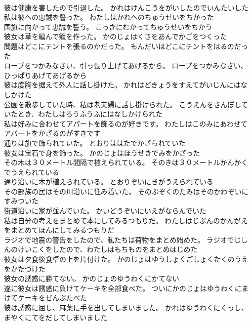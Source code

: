 \documentclass[8pt]{extreport}
\begin{document}
\begin{CJK}{UTF8}{min}
\\	彼は健康を害したので引退した。	かれはけんこうをがいしたのでいんたいした 
\\	私は彼への忠誠を誓った。	わたしはかれへのちゅうせいをちかった 
\\	国旗に向かって忠誠を誓う。	こっきにむかってちゅうせいをちかう 
\\	彼女は草を編んで籠を作った。	かのじょはくさをあんでかごをつくった 
\\	問題はどこにテントを張るのかだった。	もんだいはどこにテントをはるのだった 
\\	ロープをつかみなさい、引っ張り上げてあげるから。	ロープをつかみなさい、ひっぱりあげてあげるから 
\\	彼は度胸を据えて外人に話し掛けた。	かれはどきょうをすえてがいじんにはなしかけた 
\\	公園を散歩していた時、私は老夫婦に話し掛けられた。	こうえんをさんぽしていたとき、わたしはろうふうふにはなしかけられた 
\\	私は好みに合わせてアパートを飾るのが好きです。	わたしはこのみにあわせてアパートをかざるのがすきです 
\\	通りは旗で飾られていた。	とおりははたでかざられていた 
\\	彼女は宝石で身を飾った。	かのじょはほうせきでみをかざった 
\\	その木は３０メートル間隔で植えられている。	そのきは３０メートルかんかくでうえられている 
\\	通り沿いに木が植えられている。	とおりぞいにきがうえられている 
\\	その部族の民はその川沿いに住み着いた。	そのぶぞくのたみはそのかわぞいにすみついた 
\\	街道沿いに家が並んでいた。	かいどうぞいにいえがならんでいた 
\\	私は自分の考えをまとめて本にしてみるつもりだ。	わたしはじぶんのかんがえをまとめてほんにしてみるつもりだ 
\\	ラジオで地震の警告をしたので、私たちは荷物をまとめ始めた。	ラジオでじしんのけいこくをしたので、わたしはもちものをまとめはじめた 
\\	彼女は夕食後食卓の上を片付けた。	かのじょはゆうしょくごしょくたくのうえをかたづけた 
\\	彼女の誘惑に勝てない。	かのじょのゆうわくにかてない 
\\	遂に彼女は誘惑に負けてケーキを全部食べた。	ついにかのじょはゆうわくにまけてケーキをぜんぶたべた 
\\	彼は誘惑に屈し、麻薬に手を出してしまいました。	かれはゆうわくにくっし、まやくにてをだしてしまいました 

\end{CJK}
\end{document}
